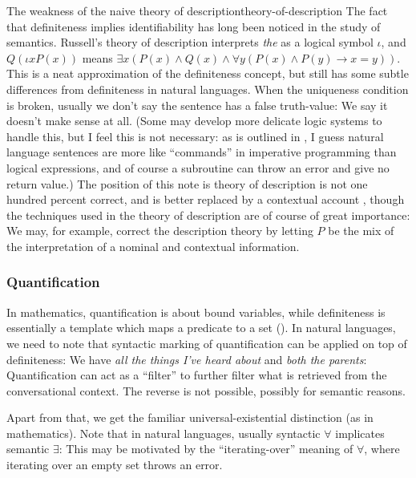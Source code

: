 \documentclass[UTF8, a4paper, oneside, scheme=plain]{ctexrep}
\newcommand*{\citepage}[1]{p.~{#1}}
\newcommand{\corpus}[1]{\emph{#1}}
\begin{document}
\begin{theorybox}{The weakness of the naive theory of description}{theory-of-description}
    The fact that definiteness implies identifiability has long been noticed in the study of semantics.
    Russell's theory of description interprets \corpus{the} 
    as a logical symbol $\iota$,
    and $Q(\iota x P(x))$
    means $\exists x (P(x) \land Q(x) \land \forall y (P(x) \land P(y) \rightarrow  x = y)) $.
    This is a neat approximation of the definiteness concept,
    but still has some subtle differences from definiteness in natural languages.
    When the uniqueness condition is broken, 
    usually we don't say the sentence has a false truth-value:
    We say it doesn't make sense at all.
    (Some may develop more delicate logic systems to handle this,
    but I feel this is not necessary:
    as is outlined in ,
    I guess natural language sentences are more like 
    ``commands'' in imperative programming than logical expressions,
    and of course a subroutine can throw an error and give no return value.)
    The position of this note is 
    theory of description is not one hundred percent correct,
    and is better replaced by a contextual account \citep[\citepage{368}]{cgel},
    though the techniques used in the theory of description
    are of course of great importance:
    We may, for example, correct the description theory 
    by letting $P$ be the mix of the interpretation of a nominal and contextual information.
\end{theorybox}


\subsubsection{Quantification}

In mathematics, quantification 
is about bound variables,
while definiteness 
is essentially a template which 
maps a predicate to a set ().
In natural languages, we need to note that 
syntactic marking of quantification can be applied on top of definiteness:
We have \corpus{all the things I've heard about} 
and \corpus{both the parents}:
Quantification can act as a ``filter'' 
to further filter what is retrieved from the conversational context.
The reverse is not possible, 
possibly for semantic reasons.

Apart from that, we get 
the familiar universal-existential distinction
(as in mathematics).
Note that in natural languages, 
usually syntactic $\forall$ implicates semantic $\exists$:
This may be motivated by the ``iterating-over'' meaning of $\forall$,
where iterating over an empty set throws an error.
\end{document}
